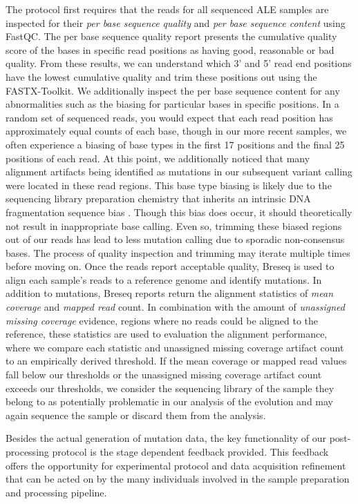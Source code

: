 \documentclass[12pt,final,masters,chapterheads]{ucsd}  %
\begin{document}
The protocol first requires that the reads for all sequenced ALE samples are inspected for their \textit{per base sequence quality} and \textit{per base sequence content} using FastQC. The per base sequence quality report presents the cumulative quality score of the bases in specific read positions as having good, reasonable or bad quality. From these results, we can understand which 3' and 5' read end positions have the lowest cumulative quality and trim these positions out using the FASTX-Toolkit. We additionally inspect the per base sequence content for any abnormalities such as the biasing for particular bases in specific positions. In a random set of sequenced reads, you would expect that each read position has approximately equal counts of each base, though in our more recent samples, we often experience a biasing of base types in the first 17 positions and the final 25 positions of each read. At this point, we additionally noticed that many alignment artifacts being identified as mutations in our subsequent variant calling were located in these read regions. This base type biasing is likely due to the sequencing library preparation chemistry that inherits an intrinsic DNA fragmentation sequence bias \cite{Head2014}. Though this bias does occur, it should theoretically not result in inappropriate base calling. Even so, trimming these biased regions out of our reads has lead to less mutation calling due to sporadic non-consensus bases. The process of quality inspection and trimming may iterate multiple times before moving on. Once the reads report acceptable quality, Breseq is used to align each sample's reads to a reference genome and identify mutations. In addition to mutations, Breseq reports return the alignment statistics of \textit{mean coverage} and \textit{mapped read} count. In combination with the amount of \textit{unassigned missing coverage} evidence, regions where no reads could be aligned to the reference, these statistics are used to evaluation the alignment performance, where we compare each statistic and unassigned missing coverage artifact count to an empirically derived threshold. If the mean coverage or mapped read values fall below our thresholds or the unassigned missing coverage artifact count exceeds our thresholds, we consider the sequencing library of the sample they belong to as potentially problematic in our analysis of the evolution and may again sequence the sample or discard them from the analysis.

Besides the actual generation of mutation data, the key functionality of our post-processing protocol is the stage dependent feedback provided. This feedback offers the opportunity for experimental protocol and data acquisition refinement that can be acted on by the many individuals involved in the sample preparation and processing pipeline.
\end{document}
